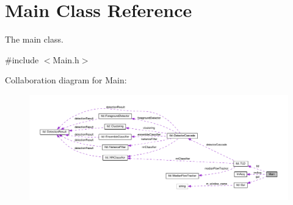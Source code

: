 \hypertarget{classMain}{\section{Main Class Reference}
\label{classMain}
}


The main class.  




{\ttfamily \#include $<$Main.\-h$>$}



Collaboration diagram for Main\-:\nopagebreak
\begin{figure}[H]
\begin{center}
\leavevmode
\includegraphics[width=350pt]{classMain__coll__graph}
\end{center}
\end{figure}
